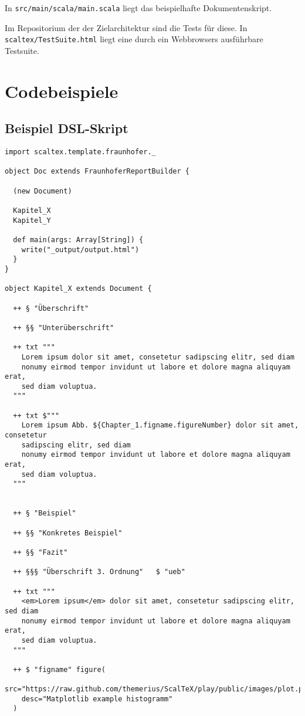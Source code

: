 In \verb+src/main/scala/main.scala+ liegt das
beispielhafte Dokumentenskript.

Im Repositorium der der Zielarchitektur sind die Tests für diese.
In \verb+scaltex/TestSuite.html+ liegt eine durch ein Webbrowsers
ausführbare Testsuite.


\chapter{Codebeispiele}

\section{Beispiel DSL-Skript}\label{sec-api-resultat}

\begin{lstlisting}[caption=Ausführliches Scala DSL Dokument-Skript.]
import scaltex.template.fraunhofer._

object Doc extends FraunhoferReportBuilder {

  (new Document)

  Kapitel_X
  Kapitel_Y

  def main(args: Array[String]) {
    write("_output/output.html")
  }
}

object Kapitel_X extends Document {

  ++ § "Überschrift"

  ++ §§ "Unterüberschrift"

  ++ txt """
    Lorem ipsum dolor sit amet, consetetur sadipscing elitr, sed diam
    nonumy eirmod tempor invidunt ut labore et dolore magna aliquyam erat,
    sed diam voluptua.
  """

  ++ txt $"""
    Lorem ipsum Abb. ${Chapter_1.figname.figureNumber} dolor sit amet, consetetur
    sadipscing elitr, sed diam
    nonumy eirmod tempor invidunt ut labore et dolore magna aliquyam erat,
    sed diam voluptua.
  """


  ++ § "Beispiel"

  ++ §§ "Konkretes Beispiel"

  ++ §§ "Fazit"

  ++ §§§ "Überschrift 3. Ordnung"   $ "ueb"

  ++ txt """
    <em>Lorem ipsum</em> dolor sit amet, consetetur sadipscing elitr, sed diam
    nonumy eirmod tempor invidunt ut labore et dolore magna aliquyam erat,
    sed diam voluptua.
  """

  ++ $ "figname" figure(
    src="https://raw.github.com/themerius/ScalTeX/play/public/images/plot.png",
    desc="Matplotlib example histogramm"
  )


\end{lstlisting}
